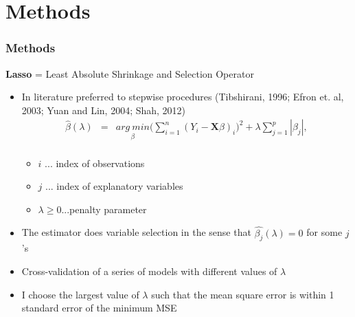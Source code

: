 \documentclass{beamer}              %
\begin{document}
\section{Methods}




\linespread{1}









\begin{frame}

\frametitle{Methods}\label{MethodsLasso} 
\textbf{Lasso} = Least Absolute Shrinkage and Selection Operator
\begin{itemize}
\item In literature preferred to stepwise procedures (Tibshirani, 1996; Efron et. al, 2003; Yuan and Lin, 2004; Shah, 2012) 
\begin{equation}\label{Lasso}
\begin{array}{lcll}

\widehat{\beta}(\lambda)&=& \underset{\beta}{arg~min} \bigg( \sum_{i=1}^{n}(Y_i - \boldsymbol{X} \beta)_i \bigg)^2 + \lambda \sum_{j=1}^p|\beta_j|, \\
\end{array}
\end{equation}

\begin{itemize}
\item $i$ ... index of observations
\item $j$ ... index of explanatory variables
\item $\lambda \geq 0$...penalty parameter
\end{itemize}

\item The estimator does variable selection in the sense that $\widehat{\beta_j}(\lambda) = 0 $ for some $j$'s
\item Cross-validation of a series of models with different values of $\lambda$
\item I choose the largest value of $\lambda$ such that the mean square error is within 1 standard error of the minimum MSE
\end{itemize}
\end{frame}
\end{document}
